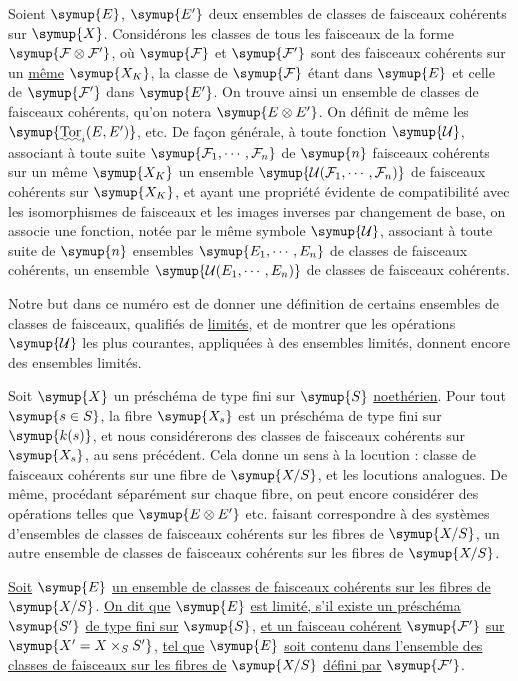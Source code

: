 Soient $\symup{E}$, $\symup{E'}$ deux ensembles de classes de faisceaux cohérents sur $\symup{X}$.
Considérons les classes de tous les faisceaux de la forme
$\symup{\mathcal F\otimes\mathcal F'}$, où $\symup{\mathcal F}$ et $\symup{\mathcal F'}$ sont des
faisceaux cohérents sur un \uline{même} $\symup{X_K}$, la classe de $\symup{\mathcal F}$ étant dans
$\symup{E}$ et celle de $\symup{\mathcal F'}$ dans $\symup{E'}$. On trouve ainsi un ensemble de
classes de faisceaux cohérents, qu'on notera $\symup{E\otimes E'}$. On définit de même
les $\symup{\mathop{\text{\uwave{Tor}}}\nolimits_i(E,E')}$, etc. De façon générale, à toute fonction
$\symup{\mathcal U}$, associant à toute suite $\symup{\mathcal F_1,\cdots,\mathcal F_n}$ de $\symup{n}$
faisceaux cohérents sur un même $\symup{X_K}$ un ensemble
$\symup{\mathcal U(\mathcal F_1,\cdots,\mathcal F_n)}$ de faisceaux cohérents sur $\symup{X_K}$, et
ayant une propriété évidente de compatibilité avec les isomorphismes de
faisceaux et les images inverses par changement de base, on associe une
fonction, notée par le même symbole $\symup{\mathcal U}$, associant à toute suite de $\symup{n}$
ensembles $\symup{E_1,\cdots,E_n}$ de classes de faisceaux cohérents, un ensemble
$\symup{\mathcal U(E_1,\cdots,E_n)}$ de classes de faisceaux cohérents.

Notre but dans ce numéro est de donner une définition de certains ensembles de
classes de faisceaux, qualifiés de \uline{limités}, et de montrer que les
opérations $\symup{\mathcal U}$ les plus courantes, appliquées à des ensembles limités, donnent
encore des ensembles limités.

Soit $\symup{X}$ un préschéma de type fini sur $\symup{S}$ \uline{noethérien}. Pour tout $\symup{s\in S}$, la
fibre $\symup{X_s}$ est un préschéma de type fini sur $\symup{k(s)}$, et nous considérerons des
classes de faisceaux cohérents sur $\symup{X_s}$, au sens précédent. Cela donne un sens
à la locution : classe de faisceaux cohérents sur une fibre de $\symup{X/S}$, et les
locutions analogues. De même, procédant séparément sur chaque fibre, on peut
encore considérer des opérations telles que $\symup{E\otimes E'}$ etc. faisant
correspondre à des systèmes d'ensembles de
classes de faisceaux cohérents sur les fibres de $\symup{X/S}$, un autre ensemble de
classes de faisceaux cohérents sur les fibres de $\symup{X/S}$.

 \uline{Soit} $\symup{E}$ \uline{un ensemble de classes de faisceaux cohérents
sur les fibres de} $\symup{X/S}$. \uline{On dit que} $\symup{E}$ \uline{est limité, s'il existe un
préschéma} $\symup{S'}$ \uline{de type fini sur} $\symup{S}$, \uline{et un faisceau cohérent} $\symup{\mathcal F'}$ \uline{sur}
$\symup{X'=X\times_S S'}$, \uline{tel que} $\symup{E}$ \uline{soit contenu dans l'ensemble des classes de
faisceaux sur les fibres de} $\symup{X/S}$ \uline{défini par} $\symup{\mathcal F'}$.


